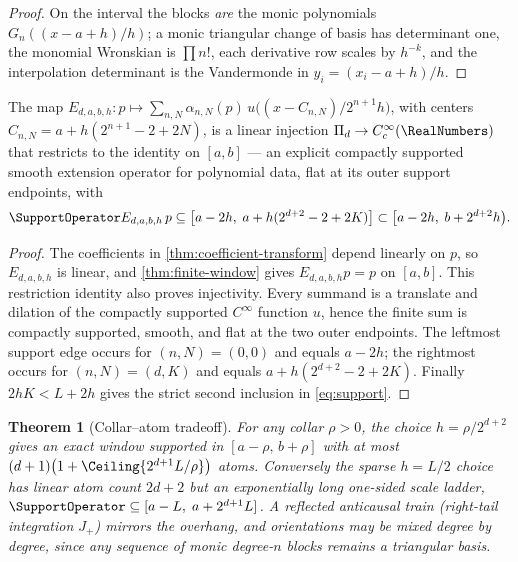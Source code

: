 \documentclass[11pt,oneside]{article}
\numberwithin{equation}{section}
\newtheorem{theorem}{Theorem}[section]
\theoremstyle{definition}
\theoremstyle{remark}
\newcommand{\PiD}{\Pi_d}
\begin{document}
\begin{proof}
On the interval the blocks \emph{are} the monic polynomials
$G_n((x-a+h)/h)$; a monic triangular change of basis has determinant
one, the monomial Wronskian is $\prod n!$, each derivative row scales
by $h^{-k}$, and the interpolation determinant is the Vandermonde in
$y_i=(x_i-a+h)/h$.
\end{proof}

\begin{proposition}
\label{prop:extension}
The map $E_{d,a,b,h}\colon p\mapsto\sum_{n,N}\alpha_{n,N}(p)\,
u\bigl((x-C_{n,N})/2^{n+1}h\bigr)$, with centers
$C_{n,N}=a+h(2^{n+1}-2+2N)$, is a linear injection
$\PiD\to C_c^\infty(\RealNumbers)$ that restricts to the identity on
$[a,b]$ --- an explicit compactly supported smooth extension operator
for polynomial data, flat at its outer support endpoints, with
\begin{equation}
 \SupportOperator E_{d,a,b,h}\,p\subseteq
 \bigl[a-2h,\;a+h(2^{d+2}-2+2K)\bigr]
 \subset\bigl[a-2h,\;b+2^{d+2}h\bigr).
 \label{eq:support}
\end{equation}
\end{proposition}

\begin{proof}
The coefficients in \cref{thm:coefficient-transform} depend linearly on
$p$, so $E_{d,a,b,h}$ is linear, and \cref{thm:finite-window} gives
$E_{d,a,b,h}p=p$ on $[a,b]$.  This restriction identity also proves
injectivity.  Every summand is a translate and dilation of the compactly
supported $C^\infty$ function $u$, hence the finite sum is compactly
supported, smooth, and flat at the two outer endpoints.  The leftmost
support edge occurs for $(n,N)=(0,0)$ and equals $a-2h$; the rightmost
occurs for $(n,N)=(d,K)$ and equals
$a+h(2^{d+2}-2+2K)$.  Finally $2hK<L+2h$ gives the strict second
inclusion in \eqref{eq:support}.
\end{proof}

\begin{theorem}[Collar--atom tradeoff]
\label{thm:collar}
For any collar $\rho>0$, the choice $h=\rho/2^{d+2}$ gives an exact
window supported in $[a-\rho,\,b+\rho]$ with at most
$(d+1)\bigl(1+\Ceiling{2^{d+1}L/\rho}\bigr)$ atoms.  Conversely the
sparse $h=L/2$ choice has linear atom count $2d+2$ but an
exponentially long one-sided scale ladder,
$\SupportOperator\subseteq[a-L,\;a+2^{d+1}L]$.  A reflected anticausal train
(right-tail integration $J_+$) mirrors the overhang, and orientations
may be mixed degree by degree, since any sequence of monic
degree-$n$ blocks remains a triangular basis.
\end{theorem}
\end{document}
